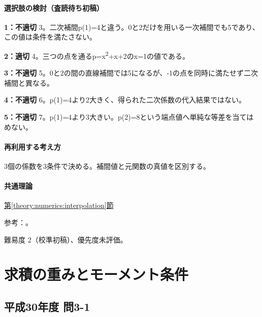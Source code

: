\paragraph{選択肢の検討（査読待ち初稿）}\mbox{}\par

\noindent\textbf{1：不適切} 3。二次補間p(1)=\allowbreak{}4と違う。0と2だけを用いる一次補間でも5であり、この値は条件を満たさない。\par

\noindent\textbf{2：適切} 4。三つの点を通るp=\allowbreak{}x\textsuperscript{2}+x+2のx=\allowbreak{}1の値である。\par

\noindent\textbf{3：不適切} 5。0と2の間の直線補間では5になるが、-1の点を同時に満たせず二次補間と異なる。\par

\noindent\textbf{4：不適切} 6。p(1)=\allowbreak{}4より2大きく、得られた二次係数の代入結果ではない。\par

\noindent\textbf{5：不適切} 7。p(1)=\allowbreak{}4より3大きい。p(2)=\allowbreak{}8という端点値へ単純な等差を当てはめない。\par

\paragraph{再利用する考え方} 3個の係数を3条件で決める。補間値と元関数の真値を区別する。

\paragraph{共通理論} \hyperref[theory:numerics:interpolation]{第\ref*{theory:numerics:interpolation}節}

\par 参考：\cite{nist_interpolation}。

\par 難易度 2（校準初稿）、優先度未評価。

\section{求積の重みとモーメント条件}

\subsection{平成30年度 問3-1}
\label{q:h30-reg-basic-3-1}


